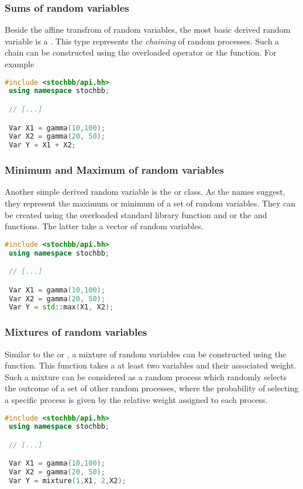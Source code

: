 \subsubsection{Sums of random variables}
Beside the affine transfrom of random variables, the most basic derived random variable is a .
This type represents the \emph{chaining} of random processes. Such a chain can be constructed using 
the overloaded \code{+} operator or the  function. For example
\begin{lstlisting}[language=C++]
 #include <stochbb/api.hh>
 using namespace stochbb;

 // [...]

 Var X1 = gamma(10,100);
 Var X2 = gamma(20, 50);
 Var Y = X1 + X2;
\end{lstlisting}

\subsubsection{Minimum and Maximum of random variables}
Another simple derived random variable is the  or  class. As the
names suggest, they represent the maximum or minimum of a set of random variables. They can be
created using the overloaded standard library function  and  or the
 and  functions. The latter take a vector of random variables.
\begin{lstlisting}[language=C++]
 #include <stochbb/api.hh>
 using namespace stochbb;

 // [...]

 Var X1 = gamma(10,100);
 Var X2 = gamma(20, 50);
 Var Y = std::max(X1, X2);
\end{lstlisting}

\subsubsection{Mixtures of random variables}
Similar to the  or , a mixture of random variables can be
constructed using the  function. This function takes a at least 
two variables and their associated weight. Such a mixture can be considered as a random process which
randomly selects the outcome of a set of other random processes, where the probability of
selecting a specific process is given by the relative weight assigned to each process.
\begin{lstlisting}[language=C++]
 #include <stochbb/api.hh>
 using namespace stochbb;

 // [...]

 Var X1 = gamma(10,100);
 Var X2 = gamma(20, 50);
 Var Y = mixture(1,X1, 2,X2);
\end{lstlisting}

